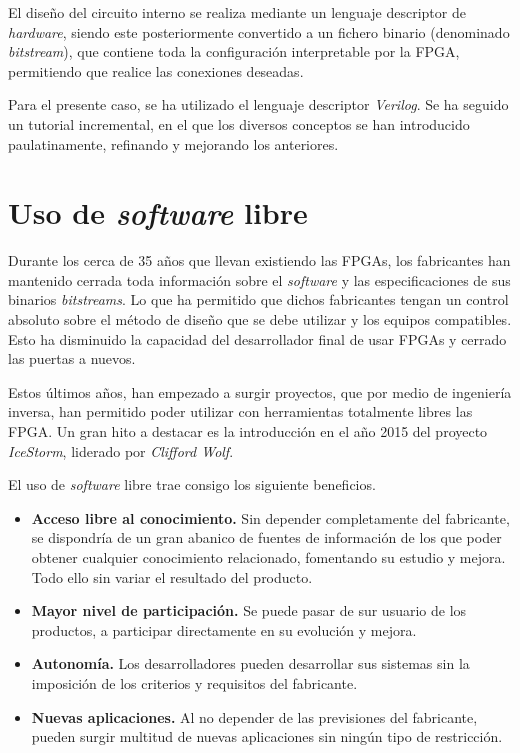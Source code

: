 El diseño del circuito interno se realiza mediante un lenguaje descriptor de \emph{hardware}, siendo este posteriormente convertido a un fichero binario (denominado \emph{bitstream}), que contiene toda la configuración interpretable por la FPGA, permitiendo que realice las conexiones deseadas.

Para el presente caso, se ha utilizado el lenguaje descriptor \emph{Verilog}. Se ha seguido un tutorial incremental\cite{obijuan:tutorial-fpga}, en el que los diversos conceptos se han introducido paulatinamente, refinando y mejorando los anteriores.

\section{Uso de \emph{software} libre}
Durante los cerca de 35 años que llevan existiendo las FPGAs, los fabricantes han mantenido cerrada toda información sobre el \emph{software} y las especificaciones de sus binarios \emph{bitstreams}. Lo que ha permitido que dichos fabricantes tengan un control absoluto sobre el método de diseño que se debe utilizar y los equipos compatibles. Esto ha disminuido la capacidad del desarrollador final de usar FPGAs y cerrado las puertas a nuevos.

Estos últimos años, han empezado a surgir proyectos, que por medio de ingeniería inversa, han permitido poder utilizar con herramientas totalmente libres las FPGA. Un gran hito a destacar es la introducción en el año 2015 del proyecto \emph{IceStorm}, liderado por \emph{Clifford Wolf}.

El uso de \emph{software} libre trae consigo los siguiente beneficios.
\begin{itemize}
    \item \textbf{Acceso libre al conocimiento.} Sin depender completamente del fabricante, se dispondría de un gran abanico de fuentes de información de los que poder obtener cualquier conocimiento relacionado, fomentando su estudio y mejora. Todo ello sin variar el resultado del producto.

    \item \textbf{Mayor nivel de participación.} Se puede pasar de sur usuario de los productos, a participar directamente en su evolución y mejora. 
    
    \item \textbf{Autonomía.} Los desarrolladores pueden desarrollar sus sistemas sin la imposición de los criterios y requisitos del fabricante.

    \item \textbf{Nuevas aplicaciones.} Al no depender de las previsiones del fabricante, pueden surgir multitud de nuevas aplicaciones sin ningún tipo de restricción.
\end{itemize}

